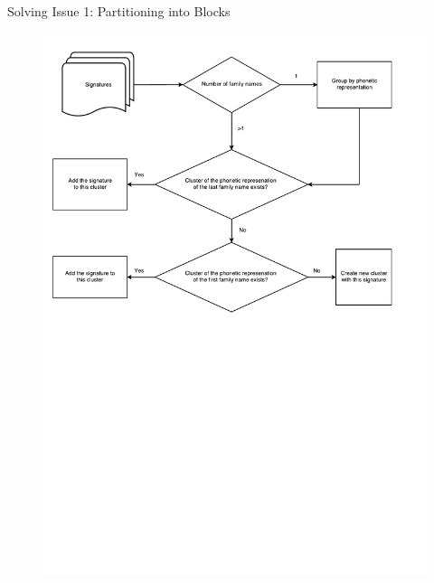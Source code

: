 \documentclass{beamer}
\begin{document}
\begin{frame} {Solving Issue 1: Partitioning into Blocks}


\begin{figure}
   \centering
   \includegraphics[width=\textwidth]{./figures/Blocking2.pdf}
\end{figure}



\end{frame}
\end{document}
